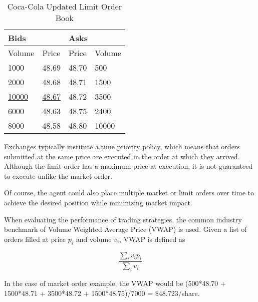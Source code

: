 \begin{table}[htbp]
\caption{Coca-Cola Updated Limit Order Book} \label{tab:coke2}
\begin{center}
\begin{tabular}{ll|ll}
\hline \hline
\multicolumn{2}{l|}{\textbf{Bids}} & \multicolumn{2}{l}{\textbf{Asks}} \\
\hline
Volume           & Price          & Price           & Volume          \\
\hline
1000             & 48.69          & 48.70           & 500             \\
2000             & 48.68          & 48.71           & 1500            \\
\underline{10000}             & \underline{48.67}          & 48.72           & 3500            \\
6000             & 48.63          & 48.75           & 2400            \\
8000             & 48.58          & 48.80           & 10000          
\end{tabular}
\end{center}
\end{table}

Exchanges typically institute a time priority policy, which means that orders submitted at the same price are executed in the order at which they arrived. Although the limit order has a maximum price at execution, it is not guaranteed to execute unlike the market order. 

Of course, the agent could also place multiple market or limit orders over time to achieve the desired position while minimizing market impact. 

When evaluating the performance of trading strategies, the common industry benchmark of Volume Weighted Average Price (VWAP) is used. Given a list of orders filled at price $p_i$ and volume $v_i$, VWAP is defined as 

$$ \frac{\sum_i{v_i p_i}}{\sum_i{v_i}}$$

In the case of market order example, the VWAP would be (500*48.70 + 1500*48.71 + 3500*48.72 + 1500*48.75)/7000 = \$48.723/share.

